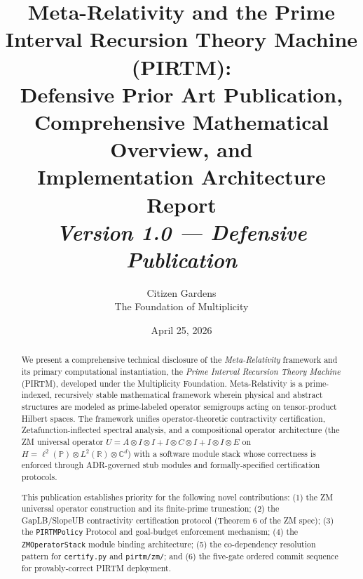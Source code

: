 \documentclass[12pt,letterpaper]{article}
\title{%
  \textbf{Meta-Relativity and the Prime Interval Recursion Theory Machine (PIRTM):}\\[4pt]
  \large Defensive Prior Art Publication,\\
  Comprehensive Mathematical Overview, and\\
  Implementation Architecture Report\\[12pt]
  \normalsize \textit{Version 1.0 --- Defensive Publication}
}
\author{%
  Citizen Gardens \\ The Foundation of Multiplicity
}
\date{April 25, 2026}
\theoremstyle{definition}
\theoremstyle{remark}
\begin{document}
\maketitle
\thispagestyle{fancy}

\vspace{1em}
\noindent{}
\vspace{1em}

\begin{abstract}
We present a comprehensive technical disclosure of the \emph{Meta-Relativity}
framework and its primary computational instantiation, the
\emph{Prime Interval Recursion Theory Machine} (PIRTM), developed under the
Multiplicity Foundation. Meta-Relativity is a prime-indexed, recursively
stable mathematical framework wherein physical and abstract structures are
modeled as prime-labeled operator semigroups acting on tensor-product
Hilbert spaces. The framework unifies operator-theoretic contractivity
certification, Zetafunction-inflected spectral analysis, and a compositional
operator architecture (the ZM universal operator
$U = A \otimes I \otimes I + I \otimes C \otimes I + I \otimes I \otimes E$
on $H = \ell^2(\mathbb{P}) \otimes L^2(\mathbb{R}) \otimes \mathbb{C}^d$)
with a software module stack whose correctness is enforced through ADR-governed
stub modules and formally-specified certification protocols.

This publication establishes priority for the following novel contributions:
(1) the ZM universal operator construction and its finite-prime truncation;
(2) the GapLB/SlopeUB contractivity certification protocol (Theorem 6 of the
ZM spec); (3) the \texttt{PIRTMPolicy} Protocol and goal-budget enforcement
mechanism; (4) the \texttt{ZMOperatorStack} module binding architecture;
(5) the co-dependency resolution pattern for \texttt{certify.py} and
\texttt{pirtm/zm/}; and (6) the five-gate ordered commit sequence for
provably-correct PIRTM deployment.
\end{abstract}
\end{document}

